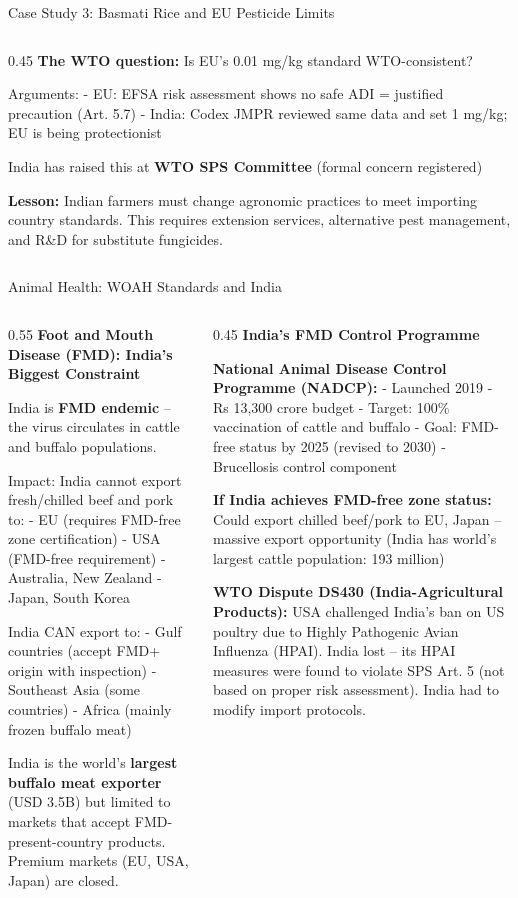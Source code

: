 \documentclass[
  ignorenonframetext,
  aspectratio=169,
]{beamer}
\makeatletter
\let\quarto@originallabel\label
\DeclareRobustCommand*{\label}[1]{\quarto@originallabel{#1}}
\makeatother
\begin{document}
\begin{frame}{Case Study 3: Basmati Rice and EU Pesticide Limits}
\begin{columns}[T]
\begin{column}{0.45\linewidth}
\textbf{The WTO question:} Is EU's 0.01 mg/kg standard WTO-consistent?

Arguments: - EU: EFSA risk assessment shows no safe ADI = justified
precaution (Art. 5.7) - India: Codex JMPR reviewed same data and set 1
mg/kg; EU is being protectionist

India has raised this at \textbf{WTO SPS Committee} (formal concern
registered)

\textbf{Lesson:} Indian farmers must change agronomic practices to meet
importing country standards. This requires extension services,
alternative pest management, and R\&D for substitute fungicides.
\end{column}
\end{columns}
\end{frame}

\begin{frame}{Animal Health: WOAH Standards and India}
\label{animal-health-woah-standards-and-india}
\begin{columns}[T]
\begin{column}{0.55\linewidth}
\textbf{Foot and Mouth Disease (FMD): India's Biggest Constraint}

India is \textbf{FMD endemic} -- the virus circulates in cattle and
buffalo populations.

Impact: India cannot export fresh/chilled beef and pork to: - EU
(requires FMD-free zone certification) - USA (FMD-free requirement) -
Australia, New Zealand - Japan, South Korea

India CAN export to: - Gulf countries (accept FMD+ origin with
inspection) - Southeast Asia (some countries) - Africa (mainly frozen
buffalo meat)

India is the world's \textbf{largest buffalo meat exporter} (USD 3.5B)
but limited to markets that accept FMD-present-country products. Premium
markets (EU, USA, Japan) are closed.
\end{column}

\begin{column}{0.45\linewidth}
\textbf{India's FMD Control Programme}

\textbf{National Animal Disease Control Programme (NADCP):} - Launched
2019 - Rs 13,300 crore budget - Target: 100\% vaccination of cattle and
buffalo - Goal: FMD-free status by 2025 (revised to 2030) - Brucellosis
control component

\textbf{If India achieves FMD-free zone status:} Could export chilled
beef/pork to EU, Japan -- massive export opportunity (India has world's
largest cattle population: 193 million)

\textbf{WTO Dispute DS430 (India-Agricultural Products):} USA challenged
India's ban on US poultry due to Highly Pathogenic Avian Influenza
(HPAI). India lost -- its HPAI measures were found to violate SPS Art. 5
(not based on proper risk assessment). India had to modify import
protocols.
\end{column}
\end{columns}
\end{frame}
\end{document}
